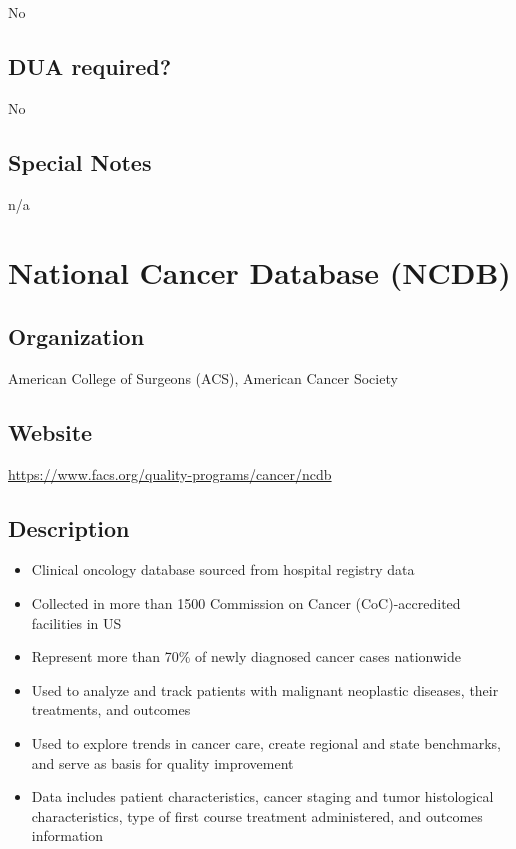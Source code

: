 \documentclass[
]{book}
\providecommand{\tightlist}{%
  \setlength{\itemsep}{0pt}\setlength{\parskip}{0pt}}
\begin{document}
No

\hypertarget{dua-required-43}{%
\section{DUA required?}\label{dua-required-43}}

No

\hypertarget{special-notes-43}{%
\section{Special Notes}\label{special-notes-43}}

n/a

\mainmatter

\hypertarget{national-cancer-database-ncdb}{%
\chapter{National Cancer Database (NCDB)}\label{national-cancer-database-ncdb}}

\hypertarget{organization-44}{%
\section{Organization}\label{organization-44}}

American College of Surgeons (ACS), American Cancer Society

\hypertarget{website-44}{%
\section{Website}\label{website-44}}

\url{https://www.facs.org/quality-programs/cancer/ncdb}

\hypertarget{description-44}{%
\section{Description}\label{description-44}}

\begin{itemize}
\tightlist
\item
  Clinical oncology database sourced from hospital registry data
\item
  Collected in more than 1500 Commission on Cancer (CoC)-accredited facilities in US
\item
  Represent more than 70\% of newly diagnosed cancer cases nationwide
\item
  Used to analyze and track patients with malignant neoplastic diseases, their treatments, and outcomes
\item
  Used to explore trends in cancer care, create regional and state benchmarks, and serve as basis for quality improvement
\item
  Data includes patient characteristics, cancer staging and tumor histological characteristics, type of first course treatment administered, and outcomes information
\end{itemize}
\end{document}
